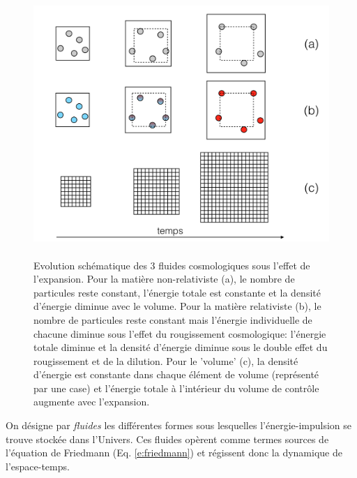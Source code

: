 \begin{figure}[htbp]
	\centering
		\includegraphics[height=10cm]{figs/fluides.png}
	\caption[Evolution des fluides cosmologiques]{Evolution schématique des 3 fluides cosmologiques sous l'effet de l'expansion. Pour la matière non-relativiste (a), le nombre de particules reste constant, l'énergie totale est constante et la densité d'énergie diminue avec le volume. Pour la matière relativiste (b), le nombre de particules reste constant mais l'énergie individuelle de chacune diminue sous l'effet du rougissement cosmologique: l'énergie totale diminue et la densité d'énergie diminue sous le double effet du rougissement et de la dilution. Pour le 'volume' (c), la densité d'énergie est constante dans chaque élément de volume (représenté par une case) et l'énergie totale à l'intérieur du volume de contrôle augmente avec l'expansion.}
	\label{f:fluides}
\end{figure}

On désigne par \textit{fluides} les différentes formes sous lesquelles l'énergie-impulsion se trouve stockée dans l'Univers. Ces fluides opèrent comme termes  sources de l'équation de Friedmann (Eq. \ref{e:friedmann}) et régissent donc la dynamique de l'espace-temps. 

